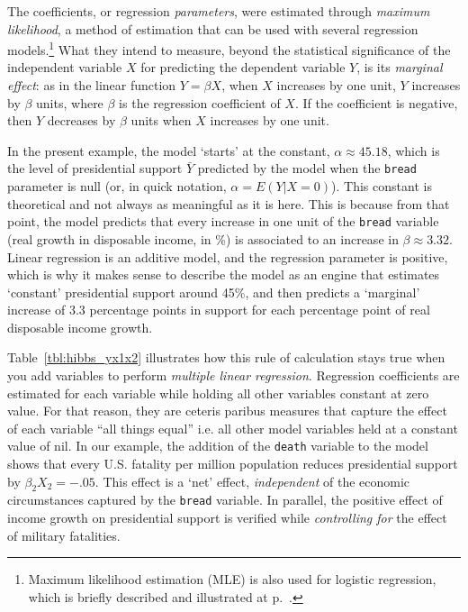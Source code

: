 	The coefficients, or regression \emph{parameters}, were estimated through \emph{maximum likelihood}, a method of estimation that can be used with several regression models.\footnote{Maximum likelihood estimation (MLE) is also used for logistic regression, which is briefly described and illustrated at p.~\pageref{sec:logit}.} What they intend to measure, beyond the statistical significance of the independent variable $X$ for predicting the dependent variable $Y$, is its \emph{marginal effect}: as in the linear function $Y=\beta X$, when $X$ increases by one unit, $Y$ increases by $\beta$ units, where $\beta$ is the regression coefficient of $X$. If the coefficient is negative, then $Y$ decreases by $\beta$ units when $X$ increases by one unit.

	In the present example, the model `starts' at the constant, $\alpha \approx 45.18$, which is the level of presidential support $\bar Y$ predicted by the model when the \texttt{bread} parameter is null (or, in quick notation, $\alpha = E(Y|X=0)$). This constant is theoretical and not always as meaningful as it is here. This is because from that point, the model predicts that every increase in one unit of the \texttt{bread} variable (real growth in disposable income, in \%) is associated to an increase in $\beta \approx 3.32$. Linear regression is an additive model, and the regression parameter is positive, which is why it makes sense to describe the model as an engine that estimates `constant' presidential support around 45\%, and then predicts a `marginal' increase of 3.3 percentage points in support for each percentage point of real disposable income growth.
	
	Table~\ref{tbl:hibbs_yx1x2} illustrates how this rule of calculation stays true when you add variables to perform \emph{multiple linear regression}. Regression coefficients are estimated for each variable while holding all other variables constant at zero value. For that reason, they are ceteris paribus measures that capture the effect of each variable ``all things equal'' i.e. all other model variables held at a constant value of nil. In our example, the addition of the \texttt{death} variable to the model shows that every U.S. fatality per million population reduces presidential support by $\beta_2 X_2=-.05$. This effect is a `net' effect, \emph{independent} of the economic circumstances captured by the \texttt{bread} variable. In parallel, the positive effect of income growth on presidential support is verified while \emph{controlling for} the effect of military fatalities.

